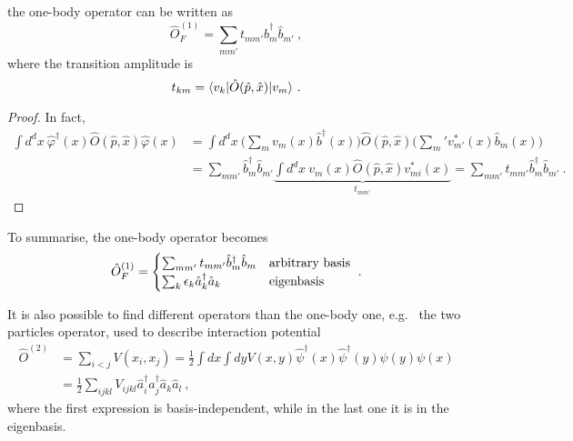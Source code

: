     the one-body operator can be written as
    \begin{equation*}
        \hat O^{(1)}_F = \sum_{mm'} t_{mm'} \hat b_m^\dagger \hat b_{m'} ~,
    \end{equation*}
    where the transition amplitude is
    \begin{equation*}
        t_{km} = \langle v_k\vert \hat O (\hat p, \hat x) \vert v_m\rangle ~.
    \end{equation*}
    \begin{proof}
        In fact,
        \begin{equation*}
        \begin{aligned}
            \int d^d x ~ \hat \varphi^\dagger (x) \hat O (\hat p, \hat x) \hat \varphi (x) & = \int d^d x ~ \Big ( \sum_m v_m(x) \hat b^\dagger (x) \Big ) \hat O (\hat p, \hat x) \Big ( \sum_m' v_{m'}^* (x) \hat b_m (x) \Big ) \\ & = \sum_{mm'} \hat b_m^\dagger \hat b_{m'} \underbrace{\int d^d x ~ v_m (x) \hat O(\hat p, \hat x) v^*_{mi} (x)}_{t_{mm'}} = \sum_{mm'} t_{mm'} \hat b_m^\dagger \hat b_{m'} ~.
        \end{aligned}
        \end{equation*}
    \end{proof}

    To summarise, the one-body operator becomes
    \begin{equation*}
        \hat O^{(1)}_F = \begin{cases}
            \sum_{m m'} t_{mm'} \hat b^\dagger_m \hat b_m & \textnormal{arbitrary basis} \\
            \sum_k \epsilon_k \hat a^\dagger_k \hat a_k & \textnormal{eigenbasis} \\
        \end{cases} ~.
    \end{equation*}

    It is also possible to find different operators than the one-body one, e.g.~ the two particles operator, used to describe interaction potential 
    \begin{equation*}
    \begin{aligned}
        \hat O^{(2)} & = \sum_{i < j} V(x_i, x_j) = \frac{1}{2} \int dx \int dy V(x,y) \hat \psi^\dagger (x) \hat \psi^\dagger (y) \psi(y) \psi (x) \\ & = \frac{1}{2} \sum_{ijkl} V_{ijkl} \hat a_i^\dagger \hat a_j^\dagger \hat a_k \hat a_l ~,
    \end{aligned}
    \end{equation*}
    where the first expression is basis-independent, while in the last one it is in the eigenbasis. 

